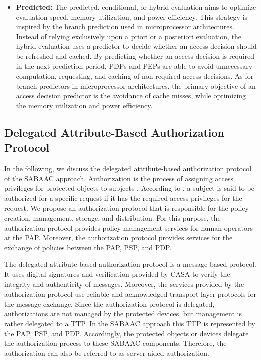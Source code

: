 \begin{itemize}
    \item \textbf{Predicted:} The predicted, conditional, or hybrid evaluation aims to optimize evaluation speed, memory utilization, and power efficiency.
    This strategy is inspired by the branch prediction used in microprocessor architectures.
    Instead of relying exclusively upon a priori or a posteriori evaluation, the hybrid evaluation uses a predictor to decide whether an access decision should be refreshed and cached.
    By predicting whether an access decision is required in the next prediction period, PDPs and PEPs are able to avoid unnecessary computation, requesting, and caching of non-required access decisions.
    As for branch predictors in microprocessor architectures, the primary objective of an access decision predictor is the avoidance of cache misses, while optimizing the memory utilization and power efficiency. 
\end{itemize}

\subsection{Delegated Attribute-Based Authorization Protocol}
\label{sec:approach:sabaac:authorization}
In the following, we discuss the delegated attribute-based authorization protocol of the SABAAC approach.
Authorization is the process of assigning access privileges for protected objects to subjects \cite{Eckert2023}.
According to \citeauthor{Eckert2023} \cite{Eckert2023}, a subject is said to be authorized for a specific request if it has the required access privileges for the request.
We propose an authorization protocol that is responsible for the policy creation, management, storage, and distribution.
For this purpose, the authorization protocol provides policy management services for human operators at the PAP.
Moreover, the authorization protocol provides services for the exchange of policies between the PAP, PSP, and PDP.

The delegated attribute-based authorization protocol is a message-based protocol.
It uses digital signatures and verification provided by CASA to verify the integrity and authenticity of messages.
Moreover, the services provided by the authorization protocol use reliable and acknowledged transport layer protocols for the message exchange.
Since the authorization protocol is delegated, authorizations are not managed by the protected devices, but management is rather delegated to a TTP.
In the SABAAC approach this TTP is represented by the PAP, PSP, and PDP.
Accordingly, the protected objects or devices delegate the authorization process to these SABAAC components.
Therefore, the authorization can also be referred to as server-aided authorization.

